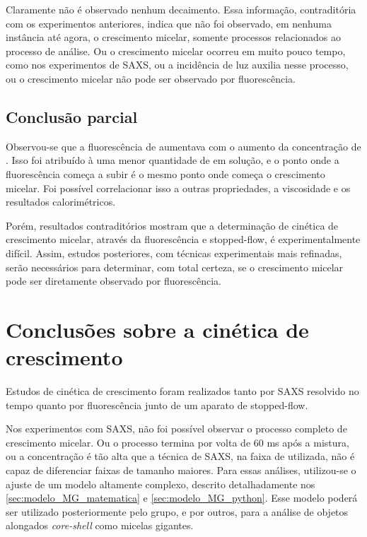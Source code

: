 	Claramente não é observado nenhum decaimento. Essa informação, contraditória com os experimentos anteriores, indica que não foi observado, em nenhuma instância até agora, o crescimento micelar, somente processos relacionados ao processo de análise. Ou o crescimento micelar ocorreu em muito pouco tempo, como nos experimentos de SAXS, ou a incidência de luz auxilia nesse processo, ou o crescimento micelar não pode ser observado por fluorescência.
	
	\section{Conclusão parcial}	 
	
	Observou-se que a fluorescência de \Sal{} aumentava com o aumento da concentração de \TTAB. Isso foi atribuído à uma menor quantidade de \Sal{} em solução, e o ponto onde a fluorescência começa a subir é o mesmo ponto onde começa o crescimento micelar. Foi possível correlacionar isso a outras propriedades, a viscosidade e os resultados calorimétricos.
	
	Porém, resultados contraditórios mostram que a determinação de cinética de crescimento micelar, através da fluorescência e stopped-flow, é experimentalmente difícil. Assim, estudos posteriores, com técnicas experimentais mais refinadas, serão necessários para determinar, com total certeza, se o crescimento micelar pode ser diretamente observado por fluorescência.
	
	\chapter{Conclusões sobre a cinética de crescimento} 
	
	Estudos de cinética de crescimento foram realizados tanto por SAXS resolvido no tempo quanto por fluorescência junto de um aparato de stopped-flow.
	
	Nos experimentos com SAXS, não foi possível observar o processo completo de crescimento micelar. Ou o processo termina por volta de 60 ms após a mistura, ou a concentração é tão alta que a técnica de SAXS, na faixa de \q{} utilizada, não é capaz de diferenciar faixas de tamanho maiores. Para essas análises, utilizou-se o ajuste de um modelo altamente complexo, descrito detalhadamente nos \autoref{sec:modelo_MG_matematica} e \autoref{sec:modelo_MG_python}. Esse modelo poderá ser utilizado posteriormente pelo grupo, e por outros, para a análise de objetos alongados \emph{core-shell} como micelas gigantes.
	
